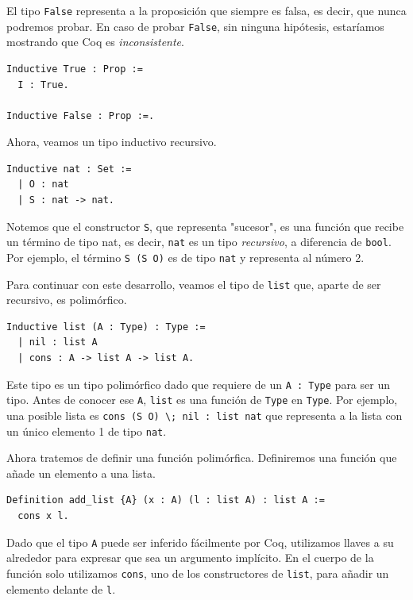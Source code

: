 El tipo \lstinline{False} representa a la proposición que siempre es falsa, es decir, que nunca podremos probar. En caso de probar \lstinline{False}, sin ninguna hipótesis, estaríamos mostrando que Coq es \emph{inconsistente}.

\begin{lstlisting}[frame=tb,caption={Definición de \lstinline{True} y \lstinline{False}},label=lst:TrueFalse]
Inductive True : Prop :=
  I : True.

Inductive False : Prop :=.
\end{lstlisting}

Ahora, veamos un tipo inductivo recursivo.

\begin{lstlisting}
Inductive nat : Set :=
  | O : nat
  | S : nat -> nat.
\end{lstlisting}

Notemos que el constructor \lstinline{S}, que representa "sucesor", es una función que recibe un término de tipo {nat}, es decir, \lstinline{nat} es un tipo \emph{recursivo}, a diferencia de \lstinline{bool}. Por ejemplo, el término \lstinline{S (S O)} es de tipo \lstinline{nat} y representa al número 2.

Para continuar con este desarrollo, veamos el tipo de \lstinline{list} que, aparte de ser recursivo, es polimórfico.

\begin{lstlisting}
Inductive list (A : Type) : Type :=
  | nil : list A
  | cons : A -> list A -> list A.
\end{lstlisting}

Este tipo es un tipo polimórfico dado que requiere de un \lstinline{A : Type} para ser un tipo. Antes de conocer ese \lstinline{A}, \lstinline{list} es una función de \lstinline{Type} en \lstinline{Type}. Por ejemplo, una posible lista es \lstinline{cons (S O) \; nil : list nat} que representa a la lista con un único elemento 1 de tipo \lstinline{nat}.

Ahora tratemos de definir una función polimórfica.
Definiremos una función que añade un elemento a una lista.

\begin{lstlisting}
Definition add_list {A} (x : A) (l : list A) : list A :=
  cons x l.
\end{lstlisting}

Dado que el tipo \lstinline{A} puede ser inferido fácilmente por Coq, utilizamos llaves a su alrededor para expresar que sea un argumento implícito. En el cuerpo de la función solo utilizamos \lstinline{cons}, uno de los constructores de \lstinline{list}, para añadir un elemento delante de \lstinline{l}.

